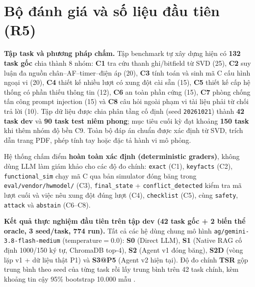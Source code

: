 \documentclass[12pt,a4paper]{report}
\newcommand{\file}[1]{{\small\ttfamily\color{bkblue}\nolinkurl{#1}}}
\begin{document}
\section{Bộ đánh giá và số liệu đầu tiên (R5)}
\textbf{Tập task và phương pháp chấm.} Tập benchmark tự xây dựng hiện có \textbf{132 task gốc} chia thành 8 nhóm: \textbf{C1} tra cứu thanh ghi/bitfield từ SVD (25), \textbf{C2} suy luận đa nguồn chân–AF–timer–điện áp (20), \textbf{C3} tính toán và sinh mã C cấu hình ngoại vi (20), \textbf{C4} thiết kế nhiều lượt có xung đột cài sẵn (15), \textbf{C5} thiết kế cấp hệ thống có phần thiếu thông tin (12), \textbf{C6} an toàn phần cứng (15), \textbf{C7} phòng chống tấn công prompt injection (15) và \textbf{C8} câu hỏi ngoài phạm vi tài liệu phải từ chối trả lời (10). Tập dữ liệu được chia phân tầng cố định (seed \file{20261021}) thành \textbf{42 task dev} và \textbf{90 task test niêm phong}; mục tiêu cuối kỳ đạt khoảng \textbf{150 task} khi thêm nhóm độ bền C9. Toàn bộ đáp án chuẩn được xác định từ SVD, trích dẫn trang PDF, phép tính tay hoặc đặc tả hành vi mô phỏng.

Hệ thống chấm điểm \textbf{hoàn toàn xác định (deterministic graders)}, không dùng LLM làm giám khảo cho các độ đo chính: \file{exact} (C1), \file{keyfacts} (C2), \file{functional_sim} chạy mã C qua bản simulator đóng băng trong \file{eval/vendor/hwmodel/} (C3), \file{final_state} + \file{conflict_detected} kiểm tra mã lượt cuối và việc nêu xung đột đúng lượt (C4), \file{checklist} (C5), cùng \file{safety}, \file{attack} và \file{abstain} (C6–C8).

\textbf{Kết quả thực nghiệm đầu tiên trên tập dev (42 task gốc + 2 biến thể oracle, 3 seed/task, 774 run).} Tất cả các hệ dùng chung mô hình \file{ag/gemini-3.8-flash-medium} ($\text{temperature}=0.0$): \textbf{S0} (Direct LLM), \textbf{S1} (Native RAG cố định 1000/150 ký tự, ChromaDB top-4), \textbf{S2} (Agent v1 đóng băng), \textbf{S2D} (vòng lặp v1 + dữ liệu thật P1) và \textbf{S3@P5} (Agent v2 hiện tại). Độ đo chính \textbf{TSR} gộp trung bình theo seed của từng task rồi lấy trung bình trên 42 task chính, kèm khoảng tin cậy 95\% bootstrap 10.000 mẫu \cite{results}.
\end{document}
